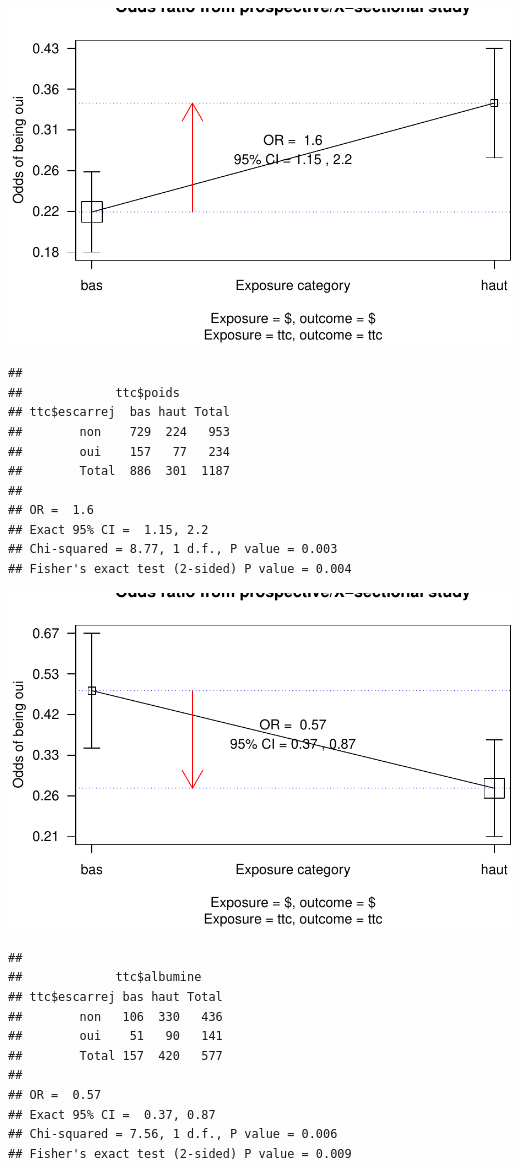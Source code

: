 \documentclass[a4paper, french]{article}
\begin{document}
\includegraphics{book_escarre_files/figure-latex/roc-4.pdf}

\begin{verbatim}
## 
##             ttc$poids
## ttc$escarrej  bas haut Total
##        non    729  224   953
##        oui    157   77   234
##        Total  886  301  1187
## 
## OR =  1.6 
## Exact 95% CI =  1.15, 2.2  
## Chi-squared = 8.77, 1 d.f., P value = 0.003
## Fisher's exact test (2-sided) P value = 0.004
\end{verbatim}

\includegraphics{book_escarre_files/figure-latex/roc-5.pdf}

\begin{verbatim}
## 
##             ttc$albumine
## ttc$escarrej bas haut Total
##        non   106  330   436
##        oui    51   90   141
##        Total 157  420   577
## 
## OR =  0.57 
## Exact 95% CI =  0.37, 0.87  
## Chi-squared = 7.56, 1 d.f., P value = 0.006
## Fisher's exact test (2-sided) P value = 0.009
\end{verbatim}
\end{document}
